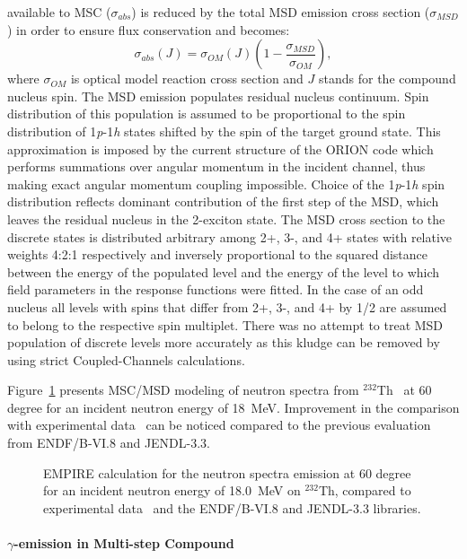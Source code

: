 \documentclass[twocolumn,amsmath,amssymb,10pt,groupedaddress,a4paper]{revtex4}
\begin{document}
available to MSC ($\sigma_{abs}$) is reduced by the total MSD emission
cross section ($\sigma_{MSD}$) in order to ensure flux conservation
and becomes:
\begin{equation}
\sigma_{abs}(J)=\sigma_{OM}(J)\left(1-\frac{\sigma_{MSD}}{\sigma_{OM}}\right),\label{CNabs}\end{equation}
\noindent where $\sigma_{OM}$ is optical model reaction cross section
and $J$ stands for the compound nucleus spin.
The MSD emission populates residual nucleus continuum.
Spin distribution of this population is assumed to be proportional
to the spin distribution of 1\emph{p}-1\emph{h} states shifted by
the spin of the target ground state. This approximation is imposed
by the current structure of the ORION code which performs
summations over angular momentum in the incident channel, thus making
exact angular momentum coupling impossible. Choice of the 1\emph{p}-1\emph{h}
spin distribution reflects dominant contribution of the first step
of the MSD, which leaves the residual nucleus in the 2-exciton
state.
The MSD cross section to the discrete states is distributed
arbitrary among 2+, 3-, and 4+ states with relative weights 4:2:1
respectively and inversely proportional to the squared distance between
the energy of the populated level and the energy of the level to which
field parameters in the response functions were fitted. In the case
of an odd nucleus all levels with spins that differ from 2+, 3-, and
4+ by 1/2 are assumed to belong to the respective spin multiplet.
There was no attempt to treat MSD population of discrete
levels more accurately as this kludge can be removed by using strict
Coupled-Channels calculations.

Figure~\ref{thoriumMSD} presents MSC/MSD modeling of neutron spectra from $^{232}$Th~\cite{crp} at
60 degree for an incident neutron energy of 18~MeV. Improvement in the comparison
with experimental data~\cite{mats} can be noticed compared to the previous evaluation from
ENDF/B-VI.8 and JENDL-3.3.
\begin{figure}[htbp]
\caption{EMPIRE calculation for the neutron spectra emission at 60 degree for an incident neutron
 energy of 18.0~MeV on $^{232}$Th, compared to experimental data~\cite{mats} and the ENDF/B-VI.8 and
JENDL-3.3 libraries.}
\label{thoriumMSD}
\end{figure}


\paragraph{$\gamma$-emission in Multi-step Compound}
\end{document}
